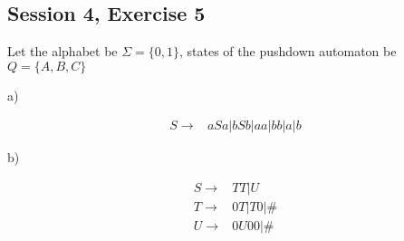 \subsection{Session 4, Exercise 5}


Let the alphabet be $\Sigma=\{0,1\}$, states of the pushdown automaton be $Q=\{A,B,C\}$

a)

\begin{align*}
S \rightarrow& aSa|bSb|aa|bb|a|b
\end{align*}

b)

\begin{align*}
S \rightarrow& TT|U \\
T \rightarrow& 0T|T0|\# \\
U \rightarrow& 0U00|\#
\end{align*}

